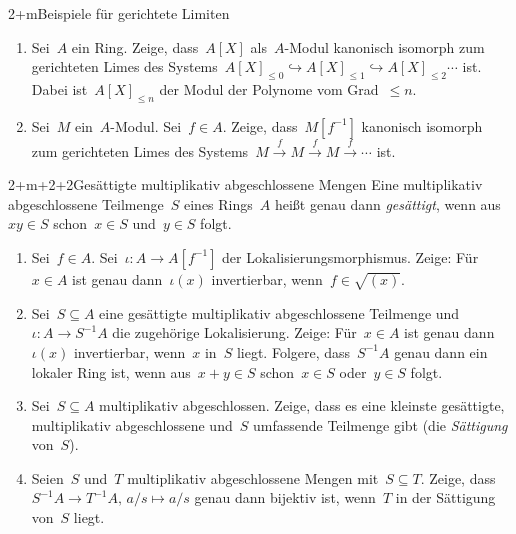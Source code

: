 \documentclass{uebblatt}
\begin{document}

\begin{aufgabe}{2+m}{Beispiele für gerichtete Limiten}
\begin{enumerate}
\item Sei~$A$ ein Ring. Zeige, dass~$A[X]$ als~$A$-Modul kanonisch isomorph zum
gerichteten Limes des Systems~$A[X]_{\leq0} \hookrightarrow A[X]_{\leq1}
\hookrightarrow A[X]_{\leq2} \cdots$ ist. Dabei ist~$A[X]_{\leq n}$ der Modul
der Polynome vom Grad~$\leq n$.
\item Sei~$M$ ein~$A$-Modul. Sei~$f \in A$. Zeige, dass~$M[f^{-1}]$ kanonisch
isomorph zum gerichteten Limes des Systems~$M \xrightarrow{f} M \xrightarrow{f}
M \xrightarrow{f} \cdots$ ist.
\end{enumerate}
\end{aufgabe}

\begin{aufgabe}{2+m+2+2}{Gesättigte multiplikativ abgeschlossene Mengen}
Eine multiplikativ abgeschlossene Teilmenge~$S$ eines Rings~$A$ heißt genau dann
\emph{gesättigt}, wenn aus~$xy \in S$ schon~$x \in S$ und~$y \in S$ folgt.
\begin{enumerate}
\item Sei~$f \in A$. Sei~$\iota : A \to A[f^{-1}]$ der
Lokalisierungsmorphismus. Zeige: Für~$x \in A$ ist genau dann~$\iota(x)$
invertierbar, wenn~$f \in \sqrt{(x)}$.
\item Sei~$S \subseteq A$ eine gesättigte multiplikativ abgeschlossene
Teilmenge und~$\iota : A \to S^{-1}A$ die zugehörige Lokalisierung.
Zeige: Für~$x \in A$ ist genau dann~$\iota(x)$ invertierbar,
wenn~$x$ in~$S$ liegt.
Folgere, dass~$S^{-1}A$ genau dann ein lokaler Ring ist, wenn aus~$x + y \in S$
schon~$x \in S$ oder~$y \in S$ folgt.
\item Sei~$S \subseteq A$ multiplikativ abgeschlossen.
Zeige, dass es eine kleinste gesättigte, mul\-ti\-pli\-ka\-tiv abgeschlossene und~$S$
umfassende Teilmenge gibt (die \emph{Sättigung} von~$S$). 
\item Seien~$S$ und~$T$ multiplikativ abgeschlossene Mengen mit~$S \subseteq
T$. Zeige, dass~$S^{-1}A \to T^{-1}A,\,a/s \mapsto a/s$ genau
dann bijektiv ist, wenn~$T$ in der Sättigung von~$S$ liegt.
\end{enumerate}
\end{aufgabe}
\end{document}
